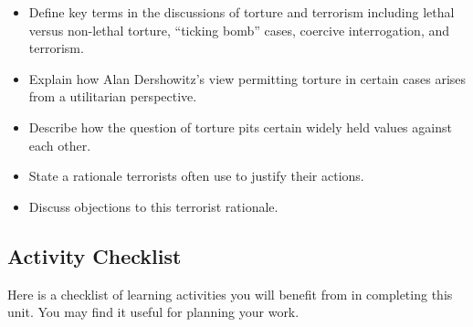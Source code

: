 \documentclass[
]{book}
\providecommand{\tightlist}{%
  \setlength{\itemsep}{0pt}\setlength{\parskip}{0pt}}
\begin{document}
\begin{itemize}
\tightlist
\item
  Define key terms in the discussions of torture and terrorism including lethal versus non-lethal torture, ``ticking bomb'' cases, coercive interrogation, and terrorism.\\
\item
  Explain how Alan Dershowitz's view permitting torture in certain cases arises from a utilitarian perspective.\\
\item
  Describe how the question of torture pits certain widely held values against each other.\\
\item
  State a rationale terrorists often use to justify their actions.\\
\item
  Discuss objections to this terrorist rationale.
\end{itemize}

\hypertarget{activity-checklist-8}{%
\subsection*{Activity Checklist}\label{activity-checklist-8}}

Here is a checklist of learning activities you will benefit from in completing this unit. You may find it useful for planning your work.
\end{document}
